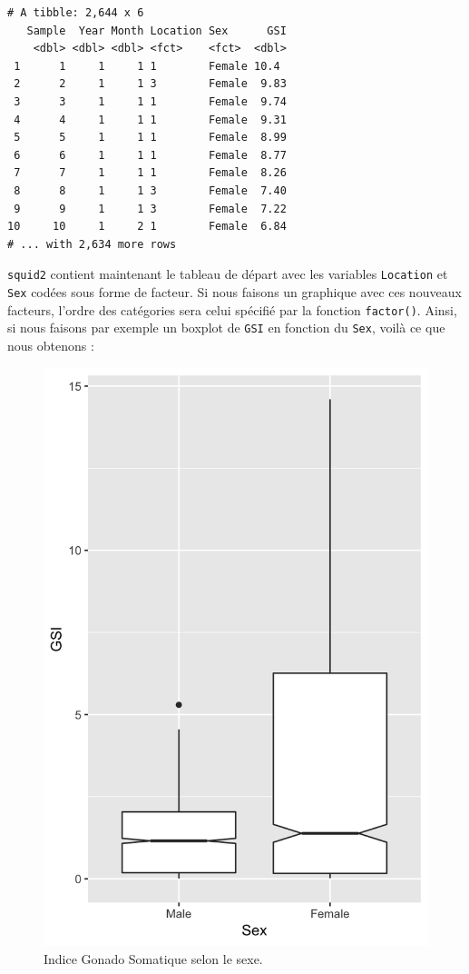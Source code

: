 \documentclass[a4paperpaper,]{article}
\newenvironment{Shaded}{\begin{snugshade}}{\end{snugshade}}
\newcommand{\DataTypeTok}[1]{\textcolor[rgb]{0.00,0.34,0.68}{#1}}
\newcommand{\KeywordTok}[1]{\textcolor[rgb]{0.12,0.11,0.11}{\textbf{#1}}}
\newcommand{\NormalTok}[1]{\textcolor[rgb]{0.12,0.11,0.11}{#1}}
\newcommand{\OperatorTok}[1]{\textcolor[rgb]{0.12,0.11,0.11}{#1}}
\newcommand{\OtherTok}[1]{\textcolor[rgb]{0.00,0.43,0.16}{#1}}
\newcommand{\StringTok}[1]{\textcolor[rgb]{0.75,0.01,0.01}{#1}}
\theoremstyle{definition}
\theoremstyle{definition}
\theoremstyle{definition}
\theoremstyle{remark}
\begin{document}
\begin{verbatim}
# A tibble: 2,644 x 6
   Sample  Year Month Location Sex      GSI
    <dbl> <dbl> <dbl> <fct>    <fct>  <dbl>
 1      1     1     1 1        Female 10.4 
 2      2     1     1 3        Female  9.83
 3      3     1     1 1        Female  9.74
 4      4     1     1 1        Female  9.31
 5      5     1     1 1        Female  8.99
 6      6     1     1 1        Female  8.77
 7      7     1     1 1        Female  8.26
 8      8     1     1 3        Female  7.40
 9      9     1     1 3        Female  7.22
10     10     1     2 1        Female  6.84
# ... with 2,634 more rows
\end{verbatim}

\texttt{squid2} contient maintenant le tableau de départ avec les
variables \texttt{Location} et \texttt{Sex} codées sous forme de
facteur. Si nous faisons un graphique avec ces nouveaux facteurs,
l'ordre des catégories sera celui spécifié par la fonction
\texttt{factor()}. Ainsi, si nous faisons par exemple un boxplot de
\texttt{GSI} en fonction du \texttt{Sex}, voilà ce que nous obtenons :

\begin{Shaded}
\end{Shaded}

\begin{figure}[htpb]

{\centering \includegraphics[width=0.5\linewidth]{figure/unnamed-chunk-137-1} 

}

\caption{Indice Gonado Somatique  selon le sexe.}\label{fig:unnamed-chunk-137}
\end{figure}
\end{document}
